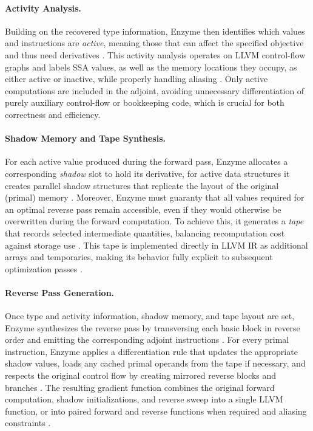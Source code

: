 \paragraph{Activity Analysis.}

Building on the recovered type information, Enzyme then identifies which values and instructions are \emph{active}, meaning those that can affect the specified objective and thus need derivatives \parencite{moses_instead_2020,peng_sound_2025}. This activity analysis operates on LLVM control-flow graphs and labels SSA values, as well as the memory locations they occupy, as either active or inactive, while properly handling aliasing \parencite{peng_sound_2025}. Only active computations are included in the adjoint, avoiding unnecessary differentiation of purely auxiliary control-flow or bookkeeping code, which is crucial for both correctness and efficiency.

\paragraph{Shadow Memory and Tape Synthesis.}

For each active value produced during the forward pass, Enzyme allocates a corresponding \emph{shadow} slot to hold its derivative, for active data structures it creates parallel shadow structures that replicate the layout of the original (primal) memory \parencite{moses_instead_2020,moses_reverse-mode_2021}. Moreover, Enzyme must guaranty that all values required for an optimal reverse pass remain accessible, even if they would otherwise be overwritten during the forward computation. To achieve this, it generates a \emph{tape} that records selected intermediate quantities, balancing recomputation cost against storage use \parencite{moses_instead_2020}. This tape is implemented directly in LLVM IR as additional arrays and temporaries, making its behavior fully explicit to subsequent optimization passes \parencite{moses_instead_2020}.

\paragraph{Reverse Pass Generation.}

Once type and activity information, shadow memory, and tape layout are set, Enzyme synthesizes the reverse pass by transversing each basic block in reverse order and emitting the corresponding adjoint instructions \parencite{moses_instead_2020,moses_supercharging_nodate}. For every primal instruction, Enzyme applies a differentiation rule that updates the appropriate shadow values, loads any cached primal operands from the tape if necessary, and respects the original control flow by creating mirrored reverse blocks and branches \parencite{moses_instead_2020}. The resulting gradient function combines the original forward computation, shadow initializations, and reverse sweep into a single LLVM function, or into paired forward and reverse functions when required and aliasing constraints \parencite{moses_enzyme_2020}.

